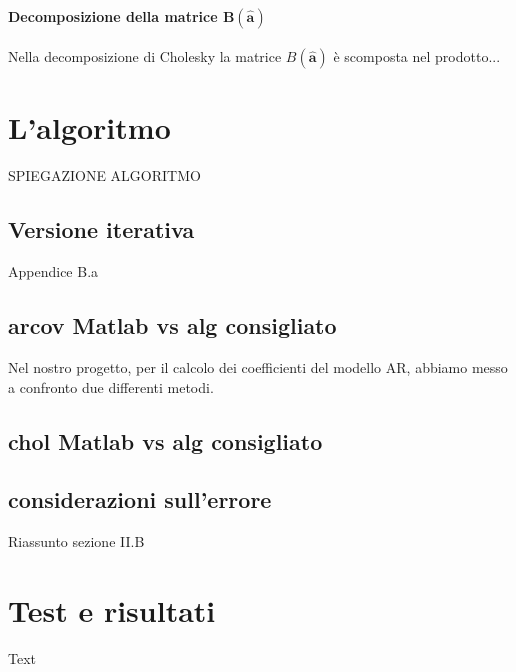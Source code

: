 \documentclass{article}
\begin{document}
\paragraph{Decomposizione della matrice $\mathbf{B(\hat{a})}$}
Nella decomposizione di Cholesky la matrice $B(\mathbf{\hat{a}})$ è scomposta nel prodotto...



\newpage
	\section{L'algoritmo} \label{algoritmo}
	SPIEGAZIONE ALGORITMO
	
	\subsection{Versione iterativa}
	Appendice B.a
	\subsection{arcov Matlab vs alg consigliato}
	Nel nostro progetto, per il calcolo dei coefficienti del modello AR, abbiamo messo a confronto due differenti metodi.
	\subsection{chol Matlab vs alg consigliato}
	\subsection{considerazioni sull'errore}
	Riassunto sezione II.B

\newpage
	\section{Test e risultati}
Text

\newpage

 

\end{document}
